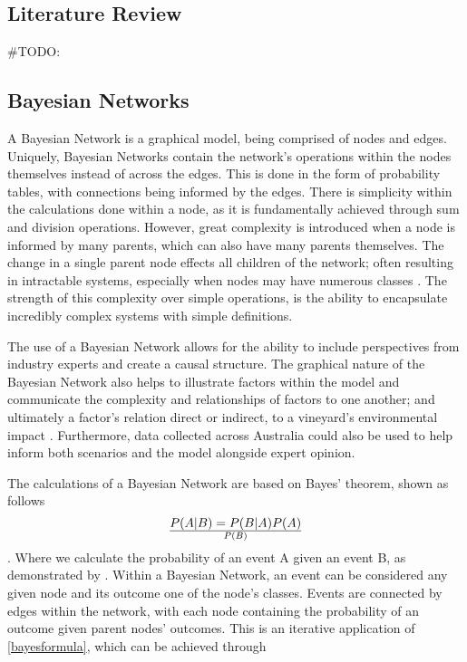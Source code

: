 \subsection{Literature Review}
#TODO:

\subsection{Bayesian Networks}

A Bayesian Network is a graphical model, being comprised of nodes and edges. Uniquely, Bayesian Networks contain the network's operations within the nodes themselves instead of across the edges. This is done in the form of probability tables, with connections being informed by the edges. There is simplicity within the calculations done within a node, as it is fundamentally achieved through sum and division operations. However, great complexity is introduced when a node is informed by many parents, which can also have many parents themselves. The change in a single parent node effects all children of the network; often resulting in intractable systems, especially when nodes may have numerous classes \citep{korbBayesianArtificialIntelligence2011}. The strength of this complexity over simple operations, is the ability to encapsulate incredibly complex systems with simple definitions.

The use of a Bayesian Network allows for the ability to include perspectives from industry experts and create a causal structure. The graphical nature of the Bayesian Network also helps to illustrate factors within the model and communicate the complexity and relationships of factors to one another; and ultimately a factor's relation direct or indirect, to a vineyard's environmental impact \citep{pourretBayesianNetworksPractical2008}. Furthermore, data collected across Australia could also be used to help inform both scenarios and the model alongside expert opinion.

The calculations of a Bayesian Network are based on Bayes' theorem, shown as follows
\begin{equation}\label{bayesformula}
P(A|B)= {P(B|A)P(A)}\over{P(B)}
\end{equation}.
Where we calculate the probability of an event A given an event B, as demonstrated by \cite{bayesLIIEssaySolving1763}. Within a Bayesian Network, an event can be considered any given node and its outcome one of the node's classes. Events are connected by edges within the network, with each node containing the probability of an outcome given parent nodes' outcomes. This is an iterative application of \ref{bayesformula}, which can be achieved through

